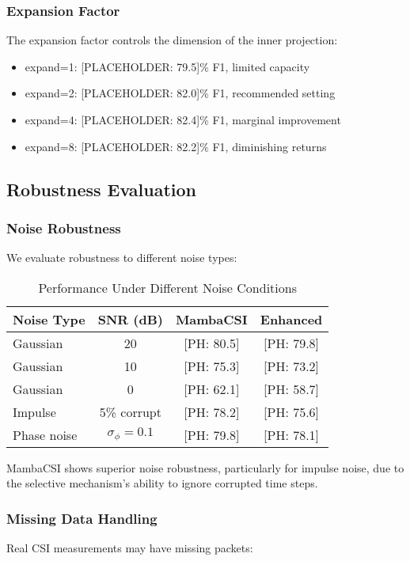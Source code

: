 \documentclass[journal]{IEEEtran}
\begin{document}
\subsubsection{Expansion Factor}
The expansion factor controls the dimension of the inner projection:

\begin{itemize}
\item expand=1: [PLACEHOLDER: 79.5]\% F1, limited capacity
\item expand=2: [PLACEHOLDER: 82.0]\% F1, recommended setting
\item expand=4: [PLACEHOLDER: 82.4]\% F1, marginal improvement
\item expand=8: [PLACEHOLDER: 82.2]\% F1, diminishing returns
\end{itemize}

\subsection{Robustness Evaluation}

\subsubsection{Noise Robustness}
We evaluate robustness to different noise types:

\begin{table}[h]
\centering
\caption{Performance Under Different Noise Conditions}
\begin{tabular}{lccc}
\toprule
Noise Type & SNR (dB) & MambaCSI & Enhanced \\
\midrule
Gaussian & 20 & [PH: 80.5] & [PH: 79.8] \\
Gaussian & 10 & [PH: 75.3] & [PH: 73.2] \\
Gaussian & 0 & [PH: 62.1] & [PH: 58.7] \\
Impulse & 5\% corrupt & [PH: 78.2] & [PH: 75.6] \\
Phase noise & $\sigma_\phi=0.1$ & [PH: 79.8] & [PH: 78.1] \\
\bottomrule
\end{tabular}
\end{table}

MambaCSI shows superior noise robustness, particularly for impulse noise, due to the selective mechanism's ability to ignore corrupted time steps.

\subsubsection{Missing Data Handling}
Real CSI measurements may have missing packets:
\end{document}
